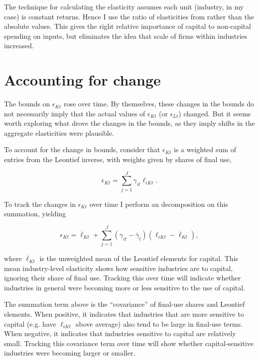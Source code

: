 \documentclass[11pt]{article}
\begin{document}
The \cite{bfshortnote,bfprodge} technique for calculating the elasticity assumes each unit (industry, in my case) is constant returns. Hence I use the ratio of elasticities from \cite{dleu2020} rather than the absolute values. This gives the right relative importance of capital to non-capital spending on inputs, but eliminates the idea that scale of firms within industries increased. 

\section{Accounting for change}
The bounds on $\epsilon_{Kt}$ rose over time. By themselves, these changes in the bounds do not necessarily imply that the actual values of $\epsilon_{Kt}$ (or $\epsilon_{Lt}$) changed. But it seems worth exploring what drove the changes in the bounds, as they imply shifts in the aggregate elasticities were plausible.

To account for the change in bounds, consider that $\epsilon_{Kt}$ is a weighted sum of entries from the Leontief inverse, with weights given by shares of final use,

\begin{equation}
	\epsilon_{Kt} = \sum_{j=1}^J \gamma_{it} \ell_{iKt}. \nonumber
\end{equation}

To track the changes in $\epsilon_{Kt}$ over time I perform an \cite{op1996} decomposition on this summation, yielding

\begin{equation}
	\epsilon_{Kt} = \overline{\ell}_{Kt} + \sum_{j=1}^J (\gamma_{it} - \overline{\gamma}_{t})(\ell_{iKt}-\overline{\ell}_{Kt}), \label{EQ_op}
\end{equation}

where $\overline{\ell}_{Kt}$ is the unweighted mean of the Leontief elements for capital. This mean industry-level elasticity shows how sensitive industries are to capital, ignoring their share of final use. Tracking this over time will indicate whether industries in general were becoming more or less sensitive to the use of capital.

The summation term above is the ``covariance'' of final-use shares and Leontief elements. When positive, it indicates that industries that are more sensitive to capital (e.g. have $\ell_{iKt}$ above average) also tend to be large in final-use terms. When negative, it indicates that industries sensitive to capital are relatively small. Tracking this covariance term over time will show whether capital-sensitive industries were becoming larger or smaller.
\end{document}
